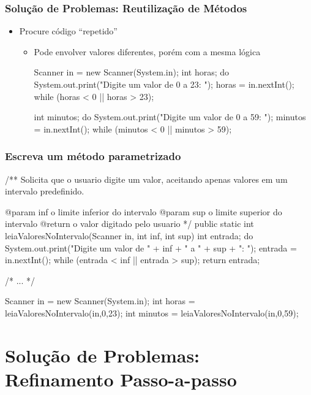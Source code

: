 \documentclass[xcolor={dvipsnames,table},aspectratio=169]{beamer}
\begin{document}
\begin{frame}[fragile]\frametitle{Solução de Problemas: Reutilização de Métodos}
\begin{itemize}
	\item Procure código ``repetido''
	\begin{itemize}
		\item Pode envolver valores diferentes, porém com a mesma lógica
\begin{javacode}
Scanner in = new Scanner(System.in);
int horas;
do {
   System.out.print("Digite um valor de 0 a 23: ");
   horas = in.nextInt();
}  while (horas < 0 || horas > 23);

int minutos;
do {
   System.out.print("Digite um valor de 0 a 59: ");
   minutos = in.nextInt();
}  while (minutos < 0 || minutos > 59);
\end{javacode}
	\end{itemize}
\end{itemize}
\end{frame}

\begin{frame}[fragile]\frametitle{Escreva um método parametrizado}
{\tiny
\begin{javacode}
/**
  Solicita que o usuario digite um valor, aceitando apenas
  valores em um intervalo predefinido.

  @param inf o limite inferior do intervalo
  @param sup o limite superior do intervalo
  @return o valor digitado pelo usuario
*/
public static int leiaValoresNoIntervalo(Scanner in, int inf, int sup) {
  int entrada;
  do {
     System.out.print("Digite um valor de " + inf + " a " + sup + ": ");
     entrada = in.nextInt();
  }  while (entrada < inf || entrada > sup);
  return entrada;
}

/* ... */

Scanner in = new Scanner(System.in);
int horas = leiaValoresNoIntervalo(in,0,23);
int minutos = leiaValoresNoIntervalo(in,0,59);
\end{javacode}
}
\end{frame}

\section{Solução de Problemas: Refinamento Passo-a-passo}
\end{document}
